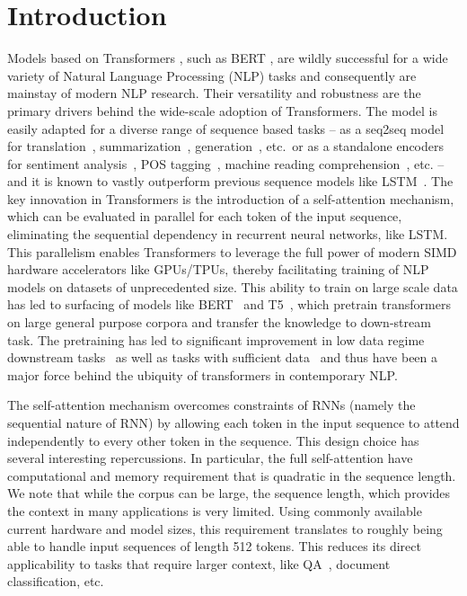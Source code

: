 \section{Introduction}
Models based on Transformers \citep{vaswani2017attention}, such as BERT \citep{devlin2018bert,liu2019roberta}, are wildly successful for a wide variety of Natural Language Processing (NLP) tasks and consequently are mainstay of modern NLP research. Their versatility and robustness are the primary drivers behind the wide-scale adoption of Transformers. The model is easily adapted for a diverse range of sequence based tasks -- as a seq2seq model for translation~\citep{vaswani2017attention}, summarization~\citep{miller2019leveraging}, generation~\citep{chen2019distilling}, etc.~or as a standalone encoders for sentiment analysis~\citep{sun2019utilizing}, POS tagging~\citep{martin2019camembert}, machine reading comprehension~\citep{wang2019multi}, etc. -- and it is known to vastly outperform previous sequence models like LSTM~\citep{hochreiter1997long}. The key innovation in Transformers is the introduction of a self-attention mechanism, which can be evaluated in parallel for each token of the input sequence, eliminating the sequential dependency in recurrent neural networks, like LSTM. This parallelism enables Transformers to leverage the full power of modern SIMD hardware accelerators like GPUs/TPUs, thereby facilitating training of NLP models on datasets of unprecedented size. This ability to train on large scale data has led to surfacing of models like BERT~\citep{devlin2018bert} and T5~\citep{raffel2019exploring}, which pretrain transformers on large general purpose corpora and transfer the knowledge to down-stream task. The pretraining has led to significant improvement in low data regime downstream tasks~\citep{kumar2020data} as well as tasks with sufficient data~\citep{yang2019xlnet} and thus have been a major force behind the ubiquity of transformers in contemporary NLP.

The self-attention mechanism  overcomes  constraints of RNNs (namely the sequential nature of RNN) by allowing each token in the input sequence to attend independently to every other token in the sequence.    This design choice has several interesting repercussions. In particular, the full self-attention have computational and memory requirement that is quadratic in the sequence length. We note that while the corpus can be large, the sequence length, which provides the context in many applications is very limited. Using commonly available current hardware and model sizes, this requirement translates to roughly being able to handle input sequences of length 512 tokens. This reduces its direct applicability to tasks that require larger context, like QA~\citep{lin2003makes}, document classification, etc.

